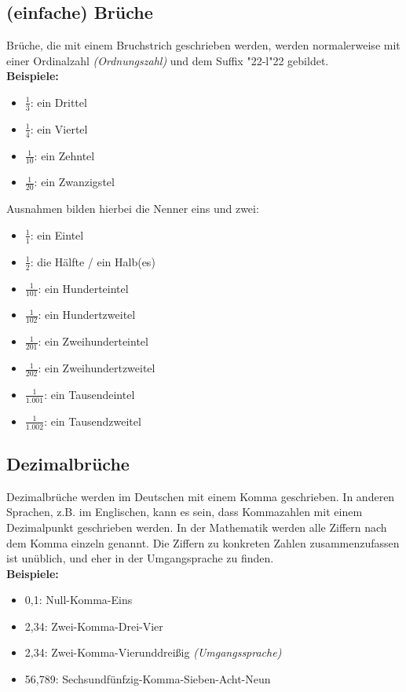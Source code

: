 \documentclass[a4paper]{article}
\newcommand{\q}[1]{\char"22{#1}\char"22 }
\begin{document}
\subsection{(einfache) Br\"uche}
Br\"uche,
die mit einem Bruchstrich geschrieben werden,
werden normalerweise mit einer Ordinalzahl
\textit{(Ordnungszahl)}
und dem Suffix \q{-l} gebildet.
\\
\textbf{Beispiele:}
\begin{itemize}
	\item $ \frac{1}{3} $: ein Drittel
	\item $ \frac{1}{4} $: ein Viertel
	\item $ \frac{1}{10} $: ein Zehntel
	\item $ \frac{1}{20} $: ein Zwanzigstel
\end{itemize}
Ausnahmen bilden hierbei die Nenner eins und zwei:
\begin{itemize}
	\item $ \frac{1}{1} $: ein Eintel
	\item $ \frac{1}{2} $: die H\"alfte / ein Halb(es)
	\item $ \frac{1}{101} $: ein Hunderteintel
	\item $ \frac{1}{102} $: ein Hundertzweitel
	\item $ \frac{1}{201} $: ein Zweihunderteintel
	\item $ \frac{1}{202} $: ein Zweihundertzweitel
	\item $ \frac{1}{1.001} $: ein Tausendeintel
	\item $ \frac{1}{1.002} $: ein Tausendzweitel
\end{itemize}

\subsection{Dezimalbr\"uche}
Dezimalbr\"uche werden im Deutschen mit einem Komma geschrieben.
In anderen Sprachen,
z.B. im Englischen,
kann es sein,
dass Kommazahlen mit einem Dezimalpunkt geschrieben werden.
In der Mathematik werden alle Ziffern nach dem Komma einzeln genannt.
Die Ziffern zu konkreten Zahlen zusammenzufassen ist un\"ublich,
und eher in der Umgangsprache zu finden.
\\
\textbf{Beispiele:}
\begin{itemize}[nosep]
	\item 0,1: Null-Komma-Eins
	\item 2,34: Zwei-Komma-Drei-Vier
	\item 2,34: Zwei-Komma-Vierunddrei{\ss}ig \textit{(Umgangssprache)}
	\item 56,789: Sechsundf\"unfzig-Komma-Sieben-Acht-Neun
\end{itemize}
\end{document}
